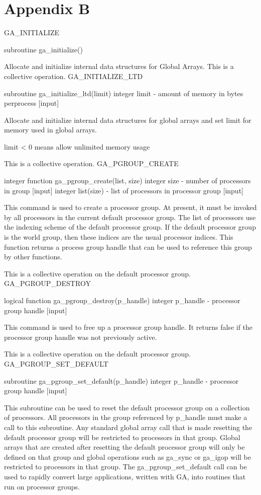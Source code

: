 
\section*{Appendix B}

GA\_INITIALIZE

subroutine ga\_initialize()

Allocate and initialize internal data structures for Global Arrays.
This is a collective operation. GA\_INITIALIZE\_LTD

subroutine ga\_initialize\_ltd(limit) integer limit - amount of memory
in bytes perprocess {[}input{]}

Allocate and initialize internal data structures for global arrays
and set limit for memory used in global arrays.

limit < 0 means \textquotedbl{}allow unlimited memory usage\textquotedbl{}

This is a collective operation. GA\_PGROUP\_CREATE

integer function ga\_pgroup\_create(list, size) integer size - number
of processors in group {[}input{]} integer list(size) - list of processors
in processor group {[}input{]}

This command is used to create a processor group. At present, it must
be invoked by all processors in the current default processor group.
The list of processors use the indexing scheme of the default processor
group. If the default processor group is the world group, then these
indices are the usual processor indices. This function returns a process
group handle that can be used to reference this group by other functions.

This is a collective operation on the default processor group. GA\_PGROUP\_DESTROY

logical function ga\_pgroup\_destroy(p\_handle) integer p\_handle
- processor group handle {[}input{]}

This command is used to free up a processor group handle. It returns
false if the processor group handle was not previously active.

This is a collective operation on the default processor group. GA\_PGROUP\_SET\_DEFAULT

subroutine ga\_pgroup\_set\_default(p\_handle) integer p\_handle -
processor group handle {[}input{]}

This subroutine can be used to reset the default processor group on
a collection of processors. All processors in the group referenced
by p\_handle must make a call to this subroutine. Any standard global
array call that is made resetting the default processor group will
be restricted to processors in that group. Global arrays that are
created after resetting the default processor group will only be defined
on that group and global operations such as ga\_sync or ga\_igop will
be restricted to processors in that group. The ga\_pgroup\_set\_default
call can be used to rapidly convert large applications, written with
GA, into routines that run on processor groups.

